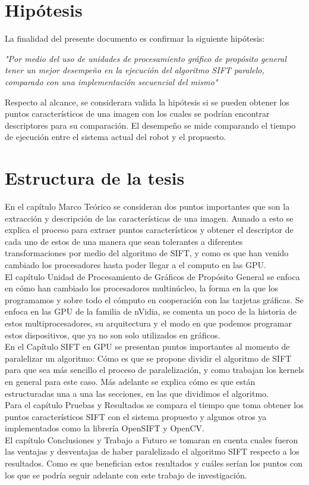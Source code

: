 \section{Hipótesis} 
La finalidad del presente documento es  confirmar la siguiente hipótesis:
\begin{center}
\textit{"Por medio del uso de unidades de procesamiento gráfico de propósito general tener un mejor desempeño en la ejecución del algoritmo SIFT paralelo, comparado con una implementación secuencial del mismo"}
\end{center}
Respecto al alcance, se considerara valida la hipótesis si se pueden obtener los puntos característicos de una imagen con los cuales se podrían encontrar descriptores para su comparación. El desempeño se mide comparando el tiempo de ejecución entre el sistema actual del robot y el propuesto.\\

\section{Estructura de la tesis}
En el capítulo Marco Teórico se consideran dos puntos importantes que son la extracción y descripción de las características de una imagen. Aunado a esto  se explica el proceso para extraer puntos característicos y obtener el descriptor de cada uno de estos de una manera que sean tolerantes a diferentes transformaciones por medio del algoritmo de SIFT, y como es que han venido cambiado los procesadores hasta poder llegar a el computo en las GPU.\\
El capítulo Unidad de Procesamiento de Gráficos de Propósito General  se enfoca en cómo han cambiado los procesadores multinúcleo, la forma en la que los programamos y sobre todo el cómputo en cooperación con las tarjetas gráficas. Se enfoca en las GPU de la familia de nVidia, se comenta un poco de la historia de estos multiprocesadores, su arquitectura y el modo en que podemos programar estos dispositivos, que ya no son solo utilizados en gráficos.\\
En el Capítulo SIFT en GPU se presentan puntos importantes al momento de paralelizar un algoritmo: Cómo es que se propone dividir el algoritmo de SIFT para que sea más sencillo el proceso de paralelización, y como trabajan los kernels en general para este caso. Más adelante se explica cómo es que están estructuradas una a una las secciones, en las que dividimos el algoritmo.\\
Para el capítulo Pruebas y Resultados se compara el tiempo que toma obtener los puntos característicos SIFT con el sistema propuesto y algunos otros ya implementados como la librería OpenSIFT y OpenCV.\\
El capítulo Conclusiones y Trabajo a Futuro se tomaran en cuenta cuales fueron las ventajas y desventajas de haber paralelizado el algoritmo SIFT respecto a los resultados. Como es que benefician estos resultados y cuáles serían los puntos con los que se podría seguir adelante con este trabajo de investigación.  \\






